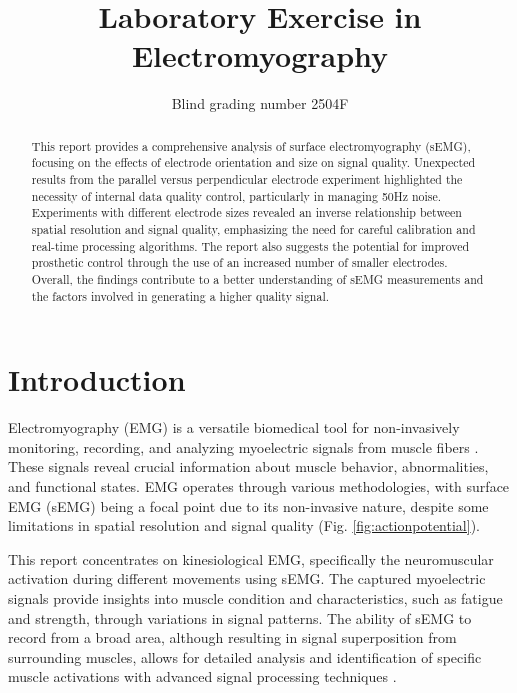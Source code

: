 \documentclass[conference]{IEEEtran}
\begin{document}
\title{Laboratory Exercise in Electromyography}
\author{Blind grading number 2504F}
\maketitle

\begin{abstract}
This report provides a comprehensive analysis of surface electromyography (sEMG), focusing on the effects of electrode orientation and size on signal quality. 
Unexpected results from the parallel versus perpendicular electrode experiment highlighted the necessity of internal data quality control,
 particularly in managing 50Hz noise. Experiments with different electrode sizes revealed an inverse relationship between spatial resolution 
 and signal quality, emphasizing the need for careful calibration and real-time processing algorithms. The report also suggests the potential 
 for improved prosthetic control through the use of an increased number of smaller electrodes. Overall, the findings contribute to a better understanding of sEMG 
 measurements and the factors involved in generating a higher quality signal.
\end{abstract}

\section{Introduction}
Electromyography (EMG) is a versatile biomedical tool for non-invasively monitoring, recording, and 
analyzing myoelectric signals from muscle fibers \cite{farinaInterpretationSurfaceElectromyogram2006}. These signals reveal crucial information 
about muscle behavior, abnormalities, and functional states. EMG operates through various methodologies, with 
surface EMG (sEMG) being a focal point due to its non-invasive nature, despite some limitations in spatial 
resolution and signal quality (Fig. \ref{fig:actionpotential}).

This report concentrates on kinesiological EMG, specifically the neuromuscular activation during different 
movements using sEMG. The captured myoelectric signals provide insights into muscle 
condition and characteristics, such as fatigue and strength, through variations in signal patterns. The ability 
of sEMG to record from a broad area, although resulting in signal superposition from surrounding 
muscles, allows for detailed analysis and identification of specific muscle activations with 
advanced signal processing techniques \cite{phinyomarkFeatureReductionSelection2012}.
\end{document}
